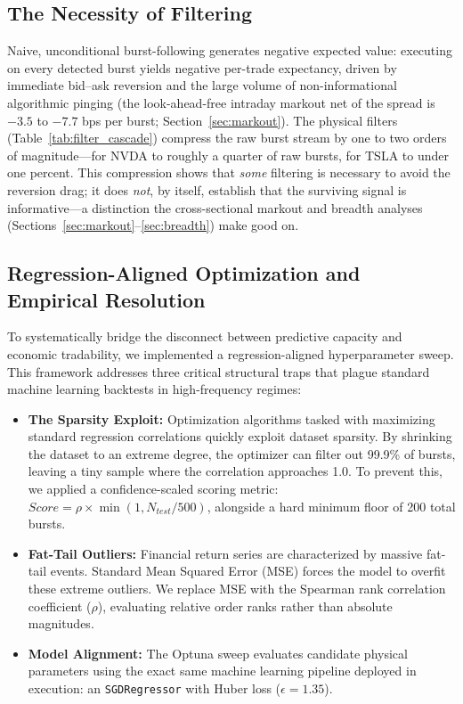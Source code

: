 \documentclass[11pt]{article}
\begin{document}
\subsection{The Necessity of Filtering}
Naive, unconditional burst-following generates negative expected value: executing on every detected burst yields negative per-trade expectancy, driven by immediate bid--ask reversion and the large volume of non-informational algorithmic pinging (the look-ahead-free intraday markout net of the spread is $-3.5$ to $-7.7$ bps per burst; Section~\ref{sec:markout}). The physical filters (Table~\ref{tab:filter_cascade}) compress the raw burst stream by one to two orders of magnitude---for NVDA to roughly a quarter of raw bursts, for TSLA to under one percent. This compression shows that \emph{some} filtering is necessary to avoid the reversion drag; it does \emph{not}, by itself, establish that the surviving signal is informative---a distinction the cross-sectional markout and breadth analyses (Sections~\ref{sec:markout}--\ref{sec:breadth}) make good on.

\subsection{Regression-Aligned Optimization and Empirical Resolution}
To systematically bridge the disconnect between predictive capacity and economic tradability, we implemented a regression-aligned hyperparameter sweep. This framework addresses three critical structural traps that plague standard machine learning backtests in high-frequency regimes:
\begin{itemize}
    \item \textbf{The Sparsity Exploit:} Optimization algorithms tasked with maximizing standard regression correlations quickly exploit dataset sparsity. By shrinking the dataset to an extreme degree, the optimizer can filter out 99.9\% of bursts, leaving a tiny sample where the correlation approaches 1.0. To prevent this, we applied a confidence-scaled scoring metric: $Score = \rho \times \min(1, N_{test}/500)$, alongside a hard minimum floor of 200 total bursts.
    \item \textbf{Fat-Tail Outliers:} Financial return series are characterized by massive fat-tail events. Standard Mean Squared Error (MSE) forces the model to overfit these extreme outliers. We replace MSE with the Spearman rank correlation coefficient ($\rho$), evaluating relative order ranks rather than absolute magnitudes.
    \item \textbf{Model Alignment:} The Optuna sweep evaluates candidate physical parameters using the exact same machine learning pipeline deployed in execution: an \texttt{SGDRegressor} with Huber loss ($\epsilon=1.35$).
\end{itemize}
\end{document}
